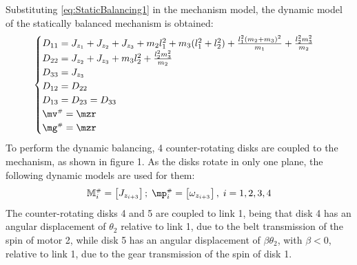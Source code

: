 \documentclass[a4paper,11pt,brazil,fleqn]{article}
\begin{document}
Substituting \eqref{eq:StaticBalancing1} in the mechanism model, the dynamic model of the statically balanced mechanism is obtained:
\begin{equation}\label{eq:StaticBalanced1}
\begin{cases}
D_{11} = J_{z_1} + J_{z_2} + J_{z_3} + m_2 l_1^2 + m_3 (l_1^2 + l_2^2) + \frac{l_1^2 (m_2 + m_3)^2}{m_1} + \frac{l_2^2 m_3^2}{m_2} \\
D_{22} = J_{z_2} + J_{z_3} + m_3 l_2^2 + \frac{l_2^2 m_3^2}{m_2} \\
D_{33} = J_{z_3} \\
D_{12} = D_{22} \\
D_{13} = D_{23} = D_{33} \\
\mv\ssh = \mzr \\
\mg\ssh = \mzr
\end{cases}
\end{equation}
To perform the dynamic balancing, 4 counter-rotating disks are coupled to the mechanism, as shown in figure 1. As the disks rotate in only one plane, the following dynamic models are used for them:
\begin{equation}\label{eq:DiscsModel1}
\mM\ssh_i = \begin{bmatrix} J_{z_{i+3}} \end{bmatrix}; \; \mp\ssh_i = \begin{bmatrix} \omega_{z_{i+3}} \end{bmatrix}, \; i = 1, 2, 3, 4
\end{equation}
The counter-rotating disks 4 and 5 are coupled to link 1, being that disk 4 has an angular displacement of $\theta_2$ relative to link 1, due to the belt transmission of the spin of motor 2, while disk 5 has an angular displacement of $\beta\theta_2$, with $\beta < 0$, relative to link 1, due to the gear transmission of the spin of disk 1.
\end{document}

